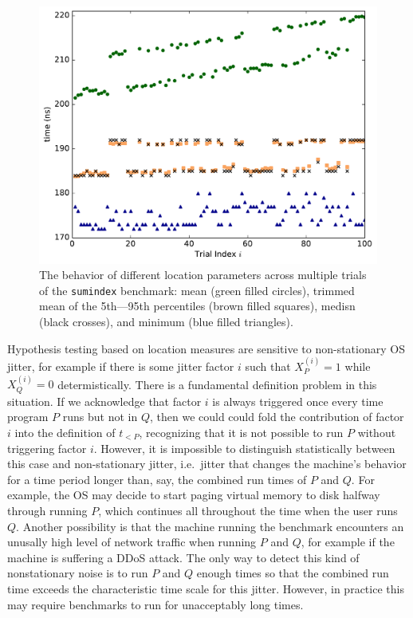 \documentclass[conference]{IEEEtran}
\begin{document}
\begin{figure}
\centering
\includegraphics[width=\columnwidth]{figures/fig3/location_estimators_sumindex}
\caption{The behavior of different location parameters across multiple trials of
the \lstinline|sumindex| benchmark: mean (green filled circles), trimmed mean of
the 5th---95th percentiles (brown filled squares), medisn (black crosses), and
minimum (blue filled triangles).}
\label{fig:locationmeasures}
\end{figure}

Hypothesis testing based on location measures are sensitive to non-stationary OS jitter, for example if there is some jitter factor $i$ such that $X^{(i)}_P = 1$ while $X^{(i)}_Q = 0$ determistically. There is a fundamental definition problem in this situation. If we acknowledge that factor $i$ is always triggered once every time program $P$ runs but not in $Q$, then we could could fold the contribution of factor $i$ into the definition of $t_{<P}$, recognizing that it is not possible to run $P$ without triggering factor $i$. However, it is impossible to distinguish statistically between this case and non-stationary jitter, i.e.\ jitter that changes the machine's behavior for a time period longer than, say, the combined run times of $P$ and $Q$. For example, the OS may decide to start paging virtual memory to disk halfway through running $P$, which continues all throughout the time when the user runs $Q$. Another possibility is that the machine running the benchmark encounters an unusally high level of network traffic when running $P$ and $Q$, for example if the machine is suffering a DDoS attack. The only way to detect this kind of nonstationary noise is to run $P$ and $Q$ enough times so that the combined run time exceeds the characteristic time scale for this jitter. However, in practice this may require benchmarks to run for unacceptably long times.
\end{document}
